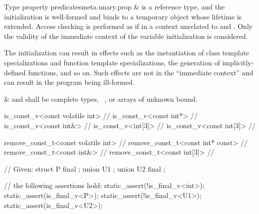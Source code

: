 \begin{libreqtab3b}{Type property predicates}{meta.unary.prop}
%
\br
   &
   is a reference type, and
  the initialization 
  is well-formed and binds  to
  a temporary object whose lifetime is extended.
  Access checking is performed as if in
  a context unrelated to  and .
  Only the validity of the immediate context of
  the variable initialization is considered.
  \begin{tailnote}
  The initialization can result in effects such as
  the instantiation of class template specializations and
  function template specializations,
  the generation of implicitly-defined functions, and so on.
  Such effects are not in the ``immediate context'' and
  can result in the program being ill-formed.
  \end{tailnote}
&
   and  shall be
  complete types, \cv{}~, or arrays of unknown bound.  \\ \rowsep

\end{libreqtab3b}

\pnum
\begin{example}
\begin{codeblock}
is_const_v<const volatile int>      // 
is_const_v<const int*>              // 
is_const_v<const int&>              // 
is_const_v<int[3]>                  // 
is_const_v<const int[3]>            // 
\end{codeblock}
\end{example}

\pnum
\begin{example}
\begin{codeblock}
remove_const_t<const volatile int>  // 
remove_const_t<const int* const>    // 
remove_const_t<const int&>          // 
remove_const_t<const int[3]>        // 
\end{codeblock}
\end{example}

\pnum
\begin{example}
\begin{codeblock}
// Given:
struct P final { };
union U1 { };
union U2 final { };

// the following assertions hold:
static_assert(!is_final_v<int>);
static_assert(is_final_v<P>);
static_assert(!is_final_v<U1>);
static_assert(is_final_v<U2>);
\end{codeblock}
\end{example}

